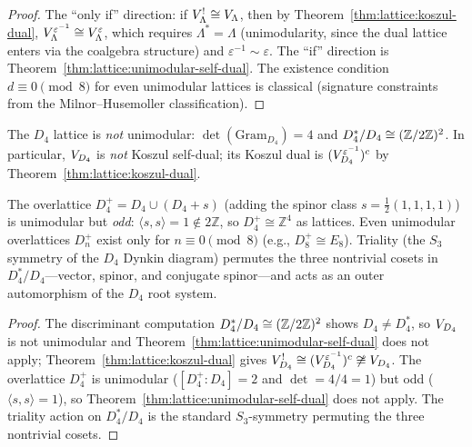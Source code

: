 \begin{proof}
The ``only if'' direction: if $V_\Lambda^! \cong V_\Lambda$,
then by Theorem~\ref{thm:lattice:koszul-dual},
$V_{\Lambda}^{\varepsilon^{-1}} \cong V_\Lambda^\varepsilon$,
which requires $\Lambda^* = \Lambda$ (unimodularity, since the dual
lattice enters via the coalgebra structure) and
$\varepsilon^{-1} \sim \varepsilon$.  The ``if'' direction is
Theorem~\ref{thm:lattice:unimodular-self-dual}.  The existence
condition $d \equiv 0 \pmod{8}$ for even unimodular lattices is
classical (signature constraints from the Milnor--Husemoller
classification).
\end{proof}

\begin{proposition}\label{prop:lattice:D4-triality}
The $D_4$ lattice is \emph{not} unimodular:
$\det(\mathrm{Gram}_{D_4}) = 4$ and $D_4^*/D_4 \cong
(\mathbb{Z}/2\mathbb{Z})^2$.
In particular, $V_{D_4}$ is \emph{not} Koszul self-dual;
its Koszul dual is $(V_{D_4}^{\varepsilon^{-1}})^c$
by Theorem~\ref{thm:lattice:koszul-dual}.

The overlattice $D_4^+ = D_4 \cup (D_4 + s)$ (adding the
spinor class $s = \tfrac{1}{2}(1,1,1,1)$) is unimodular but
\emph{odd}: $\langle s, s\rangle = 1 \notin 2\mathbb{Z}$, so
$D_4^+ \cong \mathbb{Z}^4$ as lattices.  Even unimodular
overlattices $D_n^+$ exist only for $n \equiv 0 \pmod{8}$
(e.g., $D_8^+ \cong E_8$).  Triality (the $S_3$ symmetry of
the $D_4$ Dynkin diagram) permutes the three nontrivial cosets
in $D_4^*/D_4$---vector, spinor, and conjugate
spinor---and acts as an outer automorphism of the $D_4$ root
system.
\end{proposition}

\begin{proof}
The discriminant computation $D_4^*/D_4 \cong (\mathbb{Z}/2\mathbb{Z})^2$ shows $D_4 \neq D_4^*$, so $V_{D_4}$ is not unimodular and Theorem~\ref{thm:lattice:unimodular-self-dual} does not apply; Theorem~\ref{thm:lattice:koszul-dual} gives $V_{D_4}^! \cong (V_{D_4}^{\varepsilon^{-1}})^c \not\cong V_{D_4}$.  The overlattice $D_4^+$ is unimodular ($[D_4^+ : D_4] = 2$ and $\det = 4/4 = 1$) but odd ($\langle s, s\rangle = 1$), so Theorem~\ref{thm:lattice:unimodular-self-dual} does not apply.  The triality action on $D_4^*/D_4$ is the standard $S_3$-symmetry permuting the three nontrivial cosets.
\end{proof}

